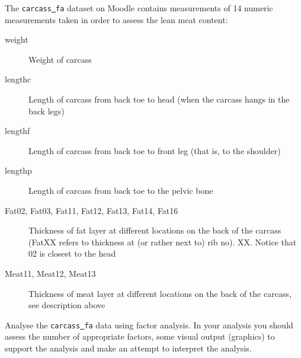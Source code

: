 \documentclass{article}
\begin{document}
The \texttt{carcass\underline{~}fa} dataset on Moodle contains measurements of 14
numeric measurements taken in order to assess the lean meat content:
{\sl
\begin{description}
\item[weight]
Weight of carcass

\item[lengthc]
Length of carcass from back toe to head (when the carcass hangs in the back legs)

\item[lengthf]
Length of carcass from back toe to front leg (that is, to the shoulder)

\item[lengthp]
Length of carcass from back toe to the pelvic bone

\item[Fat02, Fat03, Fat11, Fat12, Fat13, Fat14, Fat16] Thickness of
  fat layer at different locations on the back of the carcass (FatXX
  refers to thickness at (or rather next to) rib no). XX. Notice that
  02 is closest to the head

\item[Meat11, Meat12, Meat13]
Thickness of meat layer at different locations on the back of the carcass, see description above
\end{description}
}

Analyse the \texttt{carcass\underline{~}fa} data using factor
analysis. In your analysis you should assess the number of appropriate
factors, some visual output (graphics) to support the analysis and
make an attempt to interpret the analysis.
\end{document}
